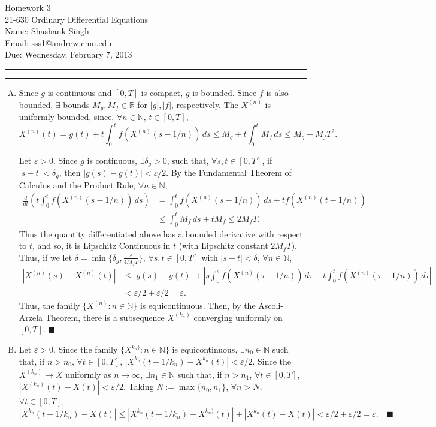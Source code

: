 \documentclass[11pt]{article}
\makeatletter
\newcounter{questionCounter}
\newcounter{partCounter}[questionCounter]
\newenvironment{question}[2][\arabic{questionCounter}]{%
    \setcounter{partCounter}{0}%
    \vspace{.25in} \hrule \vspace{0.5em}%
        \noindent{\bf #2}%
    \vspace{0.8em} \hrule \vspace{.10in}%
    \addtocounter{questionCounter}{1}%
}{}
\newcommand{\myname}{Shashank Singh}
\newcommand{\myandrew}{sss1@andrew.cmu.edu}
\newcommand{\myclass}{21-630 Ordinary Differential Equations}
\newcommand{\myhwnum}{3}
\newcommand{\duedate}{Wednesday, February 7, 2013}
\renewcommand{\qed}{\quad $\blacksquare$}
\newcommand{\mqed}{\quad \blacksquare}
\newcommand{\N}{\mathbb{N}} %
\newcommand{\R}{\mathbb{R}} %
\newcommand{\e}{\varepsilon} %
\makeatother
\begin{document}
\thispagestyle{plain}

{\Large Homework \myhwnum} \\
\myclass \\
Name: \myname \\
Email: \myandrew \\
Due: \duedate

\begin{question}{Problem 1}
\begin{enumerate}[A)]
\item Since $g$ is continuous and $[0,T]$ is compact, $g$ is bounded. Since $f$
is also bounded, $\exists$ bounds $M_g, M_f \in \R$ for $|g|,|f|$,
respectively. The $X^{(n)}$ is uniformly bounded, since,
$\forall n \in \N$, $t \in [0,T]$,
\[
 X^{(n)}(t)
 = g(t) + t\int_0^tf(X^{(n)}(s - 1/n))\,ds
 \leq M_g + t\int_0^tM_f\,ds
 \leq M_g + M_fT^2.
\]

Let $\e > 0$. Since $g$ is continuous, $\exists \delta_g > 0$, such that,
$\forall s,t \in [0,T]$, if $|s - t| < \delta_g$, then $|g(s) - g(t)| < \e/2$.
By the Fundamental Theorem of Calculus and the Product Rule, $\forall n \in \N$,
\begin{align*}
 \frac{d}{dt}\left(t\int_0^tf(X^{(n)}(s - 1/n))\,ds\right)
 &= \int_0^tf(X^{(n)}(s - 1/n))\,ds + tf(X^{(n)}(t - 1/n))\\
 &\leq \int_0^tM_f\,ds + tM_f
 \leq 2M_fT.
\end{align*}
Thus the quantity differentiated above has a bounded derivative with respect to
$t$, and so, it is Lipschitz Continuous in $t$ (with Lipschitz constant
$2M_fT$).
Thus, if we let $\delta = \min\{\delta_g,\frac{\e}{4M_fT}\}$, $\forall s,t \in
[0,T]$ with $|s - t| < \delta$, $\forall n \in \N$,
\begin{align*}
 \left|X^{(n)}(s) - X^{(n)}(t)\right|
 &\leq \left|g(s) - g(t)\right|
    + \left|s\int_0^sf(X^{(n)}(\tau - 1/n))\,d\tau
    - t\int_0^tf(X^{(n)}(\tau - 1/n))\,d\tau \right|\\
 &< \e/2 + \e/2 = \e.
\end{align*}
Thus, the family $\{X^{(n)} : n \in \N\}$ is equicontinuous. Then, by the
Ascoli-Arzela Theorem, there is a subsequence $X^{(k_n)}$ converging uniformly
on $[0,T]$. \qed

\item Let $\e > 0$. Since the family $\{X^{k_n)} : n \in \N\}$ is
equicontinuous, $\exists n_0 \in \N$ such that, if $n > n_0$,
$\forall t \in [0,T]$, $\left|X^{k_n}(t - 1/k_n) - X^{k_n}(t)\right| < \e/2$.
Since the $X^{(k_n)} \rightarrow X$ uniformly as $n \rightarrow \infty$,
$\exists n_1 \in \N$ such that, if $n > n_1$, $\forall t \in [0,T]$,
$\left|X^{(k_n)}(t) - X(t)\right| < \e/2$. Taking $N := \max\{n_0,n_1\}$,
$\forall n > N$, $\forall t \in [0,T]$,
\[
 \left|X^{k_n}(t - 1/k_n) - X(t)\right|
 \leq \left|X^{k_n}(t - 1/k_n) - X^{k_n)}(t)\right|
 +    \left|X^{k_n}(t) - X(t)\right|
 < \e/2 + \e/2 = \e. \mqed
\]


\end{enumerate}
\end{question}
\end{document}
